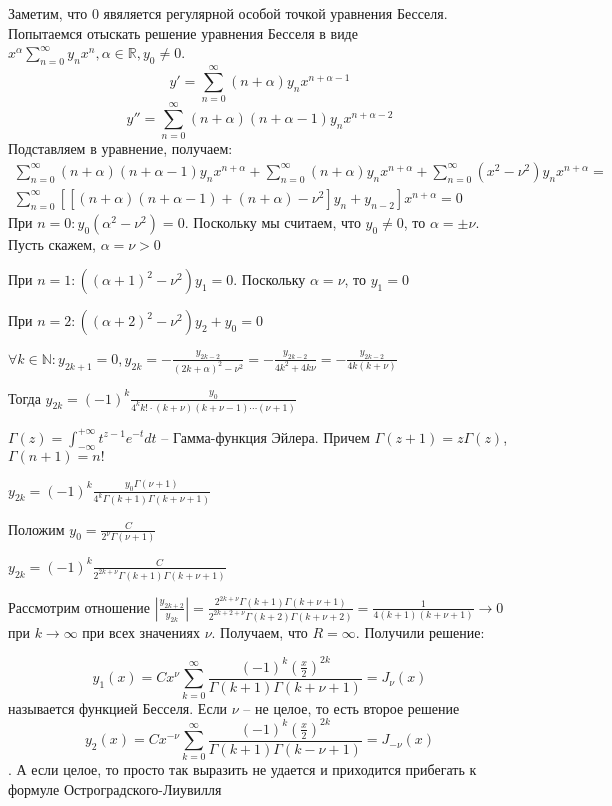 \documentclass[document.tex]{subfiles}
\begin{document}
\begin{remark}
    Заметим, что 0 явяляется регулярной особой точкой уравнения Бесселя. Попытаемся отыскать решение уравнения Бесселя в
    виде $x^{\alpha}\sum_{n = 0}^{\infty}y_n x^n, \alpha \in \mathbb{R}, y_0 \neq 0$.
    \[
        y' = \sum_{n = 0}^{\infty}(n+\alpha)y_n x^{n + \alpha - 1}
    \]
    \[
        y'' = \sum_{n = 0}^{\infty}(n + \alpha)(n + \alpha - 1) y_n x^{n + \alpha - 2}
    \]
    Подставляем в уравнение, получаем:
    \begin{multline*}
        \sum_{n = 0}^{\infty}(n + \alpha)(n + \alpha - 1) y_n x^{n + \alpha} + \sum_{n = 0}^{\infty}(n + \alpha) y_n
        x^{n + \alpha} +
        \sum_{n = 0}^{\infty}(x^2 - \nu^2)y_n x^{n + \alpha} = \\
        \sum_{n = 0}^{\infty}\left[\left[(n + \alpha)(n + \alpha - 1) + (n + \alpha) - \nu^2 \right]y_n + y_{n -
        2}\right]x^{n + \alpha} = 0
    \end{multline*}
    При $n = 0: y_0(\alpha^2 - \nu^2) = 0$. Поскольку мы считаем, что $y_0 \neq 0$, то $\alpha = \pm \nu$. Пусть скажем,
    $\alpha = \nu > 0$

    При $n = 1: ((\alpha + 1)^2 - \nu^2)y_1 = 0$. Поскольку $\alpha = \nu$, то $y_1 = 0$

    При $n = 2: ((\alpha + 2)^2 - \nu^2)y_2 + y_0 = 0$

    $\forall k \in \mathbb{N}: y_{2k + 1} = 0, y_{2k} = -\frac{y_{2k - 2}}{(2k + \alpha)^2 - \nu^2} =
    -\frac{y_{2k - 2}}{4k^2 + 4k\nu} = -\frac{y_{2k - 2}}{4k(k + \nu)}$

    Тогда $y_{2k} = (-1)^{k}\frac{y_0}{4^{k} k! \cdot (k + \nu) (k + \nu - 1) \cdots (\nu + 1)}$
\end{remark}

\begin{definition}
    $\Gamma(z) = \int_{-\infty}^{+\infty}t^{z - 1}e^{-t}dt$ -- Гамма-функция Эйлера. Причем $\Gamma(z+1) = z\Gamma(z)$,
    $\Gamma(n + 1) = n!$
\end{definition}

$y_{2k} = (-1)^k\frac{y_0 \Gamma(\nu + 1)}{4^{k}\Gamma(k + 1) \Gamma(k + \nu + 1)}$

Положим $y_0 = \frac{C}{2^{\nu}\Gamma(\nu + 1)}$

$y_{2k} = (-1)^k \frac{C}{2^{2k + \nu}\Gamma(k + 1)\Gamma(k + \nu + 1)}$

Рассмотрим отношение $\left| \frac{y_{2k + 2}}{y_{2k}}\right| = \frac{2^{2k + \nu}\Gamma(k + 1)\Gamma(k + \nu +
1)}{2^{2k + 2 + \nu}\Gamma(k + 2)\Gamma(k + \nu + 2)} = \frac{1}{4 (k + 1)(k + \nu + 1)} \rightarrow 0$ при $k
\rightarrow \infty$ при всех значениях $\nu$. Получаем, что $R = \infty$. Получили решение:

\[
    y_1(x) = Cx^{\nu}\sum_{k = 0}^{\infty} \frac{(-1)^k(\frac{x}{2})^{2k}}{\Gamma(k + 1) \Gamma(k + \nu + 1)} =
    J_{\nu}(x)
\]
называется функцией Бесселя. Если $\nu$ -- не целое, то есть второе решение
\[
    y_2(x) = C x^{-\nu}\sum_{k = 0}^{\infty}\frac{(-1)^k (\frac{x}{2})^{2k}}{\Gamma(k + 1) \Gamma (k - \nu + 1)} =
    J_{-\nu}(x)
\]. А если целое, то просто так выразить не удается и приходится прибегать к формуле Остроградского-Лиувилля
\end{document}

